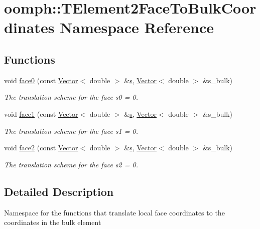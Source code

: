 \hypertarget{namespaceoomph_1_1TElement2FaceToBulkCoordinates}{}\section{oomph\+:\+:T\+Element2\+Face\+To\+Bulk\+Coordinates Namespace Reference}
\label{namespaceoomph_1_1TElement2FaceToBulkCoordinates}
\subsection*{Functions}
\begin{DoxyCompactItemize}
\item 
void \hyperlink{namespaceoomph_1_1TElement2FaceToBulkCoordinates_ab280231d6d457a710b26ea8fa934e330}{face0} (const \hyperlink{classoomph_1_1Vector}{Vector}$<$ double $>$ \&\hyperlink{cfortran_8h_ab7123126e4885ef647dd9c6e3807a21c}{s}, \hyperlink{classoomph_1_1Vector}{Vector}$<$ double $>$ \&s\+\_\+bulk)
\begin{DoxyCompactList}\small\item\em The translation scheme for the face s0 = 0. \end{DoxyCompactList}\item 
void \hyperlink{namespaceoomph_1_1TElement2FaceToBulkCoordinates_a66ea86f83fa5b215f4fa04b61d8f8ef4}{face1} (const \hyperlink{classoomph_1_1Vector}{Vector}$<$ double $>$ \&\hyperlink{cfortran_8h_ab7123126e4885ef647dd9c6e3807a21c}{s}, \hyperlink{classoomph_1_1Vector}{Vector}$<$ double $>$ \&s\+\_\+bulk)
\begin{DoxyCompactList}\small\item\em The translation scheme for the face s1 = 0. \end{DoxyCompactList}\item 
void \hyperlink{namespaceoomph_1_1TElement2FaceToBulkCoordinates_ab06fc24227192debadc7104abd85cb5b}{face2} (const \hyperlink{classoomph_1_1Vector}{Vector}$<$ double $>$ \&\hyperlink{cfortran_8h_ab7123126e4885ef647dd9c6e3807a21c}{s}, \hyperlink{classoomph_1_1Vector}{Vector}$<$ double $>$ \&s\+\_\+bulk)
\begin{DoxyCompactList}\small\item\em The translation scheme for the face s2 = 0. \end{DoxyCompactList}\end{DoxyCompactItemize}


\subsection{Detailed Description}
Namespace for the functions that translate local face coordinates to the coordinates in the bulk element 

